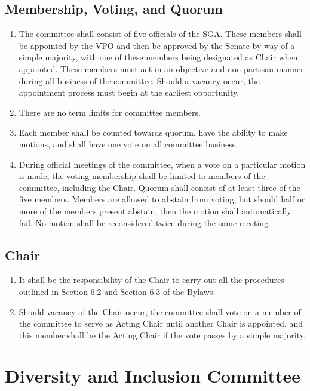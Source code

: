 \documentclass[12pt]{scrreprt}
\begin{document}
\subsection {Membership, Voting, and Quorum}
\begin{enumerate}
    \item The committee shall consist of five officials of the SGA. These members
shall be appointed by the VPO and then be approved by the Senate by way
of a simple majority, with one of these members being designated as Chair
when appointed. These members must act in an objective and non-partisan
manner during all business of the committee. Should a vacancy occur, the
appointment process must begin at the earliest opportunity.
\item There are no
term limits for committee members.
\item Each member shall be counted
towards quorum, have the ability to make motions,
and shall have one vote on all committee business.
\item During official meetings of
the committee, when a vote on a particular motion is made, the voting
membership shall be limited to members of the committee, including the
Chair. Quorum shall consist of at least three of the five members. Members
are allowed to abstain from voting, but should half or more of the
members present abstain, then the motion shall automatically fail. No
motion shall be reconsidered twice during the same meeting.
\end{enumerate}
\subsection {Chair}
\begin{enumerate}
    \item It shall be the responsibility of the Chair to carry out all the procedures
outlined in
Section 6.2 and Section 6.3 of the Bylaws.
\item Should vacancy of the Chair occur,
the committee shall vote on a member of the committee to serve as Acting
Chair until another Chair is appointed, and this member shall be the Acting
Chair if the vote passes by a simple majority.
\end{enumerate}

\section{Diversity and Inclusion Committee}
\end{document}
